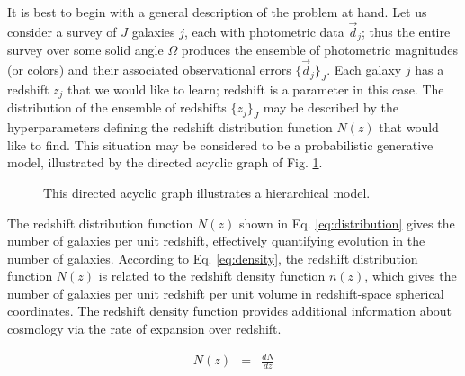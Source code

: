 \documentclass[preprint]{aastex}
\begin{document}
It is best to begin with a general description of the problem at hand.  Let us 
consider a survey of $J$ galaxies $j$, each with photometric data 
$\vec{d}_{j}$; thus the entire survey over some solid angle $\Omega$ produces 
the ensemble of photometric magnitudes (or colors) and their associated 
observational errors $\{\vec{d}_{j}\}_{J}$.  Each galaxy $j$ has a redshift 
$z_{j}$ that we would like to learn; redshift is a parameter in this case.  The 
distribution of the ensemble of redshifts $\{z_{j}\}_{J}$ may be described by 
the hyperparameters defining the redshift distribution function $N(z)$ that 
would like to find.  This situation may be considered to be a probabilistic 
generative model, illustrated by the directed acyclic graph of Fig. 
\ref{fig:flow}.  

\begin{figure}
\vspace{0.5cm}
\begin{center}
\caption{This directed acyclic graph illustrates a hierarchical model.}
\label{fig:flow}
\end{center}
\end{figure}

The redshift distribution function $N(z)$ shown in Eq. \ref{eq:distribution} 
gives the number of galaxies per unit redshift, effectively quantifying 
evolution in the number of galaxies.  \citep{Menard2013}  According to Eq. 
\ref{eq:density}, the redshift distribution function $N(z)$ is related to the 
redshift density function $n(z)$, which gives the number of galaxies per unit 
redshift per unit volume in redshift-space spherical coordinates.  The redshift 
density function provides additional information about cosmology via the rate 
of expansion over redshift.

\begin{eqnarray}
\label{eq:distribution}
N(z) &=& \frac{dN}{dz}
\end{eqnarray}
\end{document}
